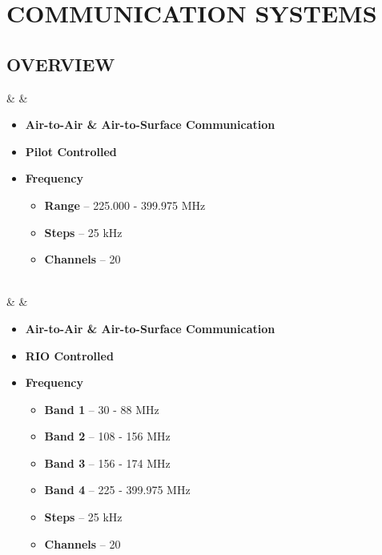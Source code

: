 \documentclass[fontInter]{TechCheck}
\begin{document}
	\cleardoublepage

	\section{COMMUNICATION SYSTEMS}
	\subsection{OVERVIEW}
	\begin{listlongtable}
		\textbf{\textbullet} &   &
		\begin{minipage}[t]{\linewidth}
			\vspace{-7pt}
			\begin{itemize}
				\item \textbf{Air-to-Air \& Air-to-Surface Communication}
				\item \textbf{Pilot Controlled}
				\item \textbf{Frequency}
				\begin{itemize}
					\item \textbf{Range} -- 225.000 - 399.975 MHz
					\item \textbf{Steps} -- 25 kHz
					\item \textbf{Channels} -- 20
				\end{itemize}
			\end{itemize}
		\end{minipage} \\
		\midrule
		\textbf{\textbullet} &   &
		\begin{minipage}[t]{\linewidth}
			\vspace{-7pt}
			\begin{itemize}
				\item \textbf{Air-to-Air \& Air-to-Surface Communication}
				\item \textbf{RIO Controlled}
				\item \textbf{Frequency}
				\begin{itemize}
					\item \textbf{Band 1} -- 30 - 88 MHz
					\item \textbf{Band 2} -- 108 - 156 MHz
					\item \textbf{Band 3} -- 156 - 174 MHz
					\item \textbf{Band 4} -- 225 - 399.975 MHz
					\item \textbf{Steps} -- 25 kHz
					\item \textbf{Channels} -- 20
				\end{itemize}

\end{itemize}
\end{minipage}
\end{listlongtable}
\end{document}

